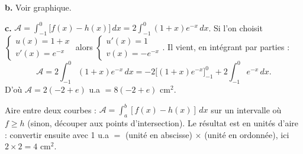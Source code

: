 \documentclass[11pt]{article}
\begin{document}
\textbf{b.} Voir graphique.

\textbf{c.} $\mathscr{A} = \displaystyle\int_{-1}^0 \big[f(x) - h(x)\big]\,dx = 2\int_{-1}^0 (1 + x)e^{-x}\,dx$. Si l'on choisit $\begin{cases} u(x) = 1 + x \\ v'(x) = e^{-x} \end{cases}$ alors $\begin{cases} u'(x) = 1 \\ v(x) = -e^{-x} \end{cases}$. Il vient, en intégrant par parties :
\[ \mathscr{A} = 2\int_{-1}^0 (1 + x)e^{-x}\,dx = -2\Big[(1 + x)e^{-x}\Big]_{-1}^0 + 2\int_{-1}^0 e^{-x}\,dx. \]
D'où $\mathscr{A} = 2(-2 + e)$ u.a $= 8(-2 + e)$ cm$^2$.

\begin{methode}
Aire entre deux courbes : $\mathscr{A} = \int_a^b [f(x) - h(x)]\,dx$
sur un intervalle où $f \ge h$ (sinon, découper aux points
d'intersection). Le résultat est en unités d'aire : convertir ensuite
avec 1 u.a $=$ (unité en abscisse) $\times$ (unité en ordonnée), ici
$2 \times 2 = 4$ cm$^2$.
\end{methode}
\end{document}
